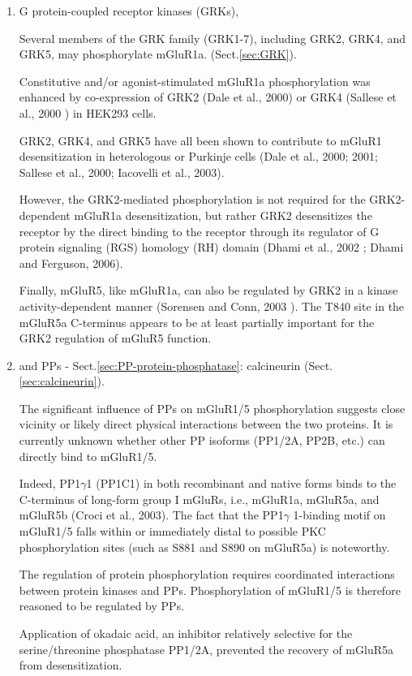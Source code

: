 \begin{enumerate}
  \item  G protein-coupled receptor kinases (GRKs), 
  
  
Several members of the GRK family (GRK1-7), including GRK2, GRK4, and GRK5, may
phosphorylate mGluR1a. (Sect.\ref{sec:GRK}).

Constitutive and/or agonist-stimulated mGluR1a phosphorylation was enhanced by
co-expression of GRK2 (Dale et al., 2000) or GRK4 (Sallese et al., 2000 ) in
HEK293 cells.

GRK2, GRK4, and GRK5 have all been shown to contribute to
mGluR1 desensitization in heterologous or Purkinje cells (Dale et al., 2000;
2001; Sallese et al., 2000; Iacovelli et al., 2003).

However, the GRK2-mediated phosphorylation is not required for the
GRK2-dependent mGluR1a desensitization, but rather GRK2 desensitizes the
receptor by the direct binding to the receptor through its regulator of G
protein signaling (RGS) homology (RH) domain (Dhami et al., 2002 ; Dhami and
Ferguson, 2006).

Finally, mGluR5, like mGluR1a, can also be regulated by GRK2 in a kinase
activity-dependent manner (Sorensen and Conn, 2003 ). The T840 site in the
mGluR5a C-terminus appears to be at least partially important for the GRK2
regulation of mGluR5 function.

  \item and PPs - Sect.\ref{sec:PP-protein-phosphatase}: calcineurin
  (Sect.\ref{sec:calcineurin}).
  
The significant influence of PPs on mGluR1/5 phosphorylation suggests close
vicinity or likely direct physical interactions between the two proteins.
It is currently unknown whether other PP isoforms (PP1/2A, PP2B, etc.) can
directly bind to mGluR1/5.

Indeed, PP1$\gamma$1 (PP1C1) in both recombinant and native forms binds to the
C-terminus of long-form group I mGluRs, i.e., mGluR1a, mGluR5a, and mGluR5b
(Croci et al., 2003). The fact that the PP1$\gamma$ 1-binding motif on mGluR1/5
falls within or immediately distal to possible PKC phosphorylation sites (such
as S881 and S890 on mGluR5a) is noteworthy.

  
The regulation of protein phosphorylation requires coordinated interactions between protein
kinases and PPs. Phosphorylation of mGluR1/5 is therefore reasoned to be
regulated by PPs.

Application of okadaic acid, an inhibitor relatively selective for the
serine/threonine phosphatase PP1/2A, prevented the recovery of mGluR5a from
desensitization.


\end{enumerate}
